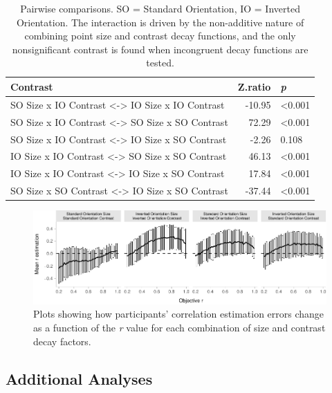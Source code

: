 \documentclass[manuscript, anonymous, screen]{acmart}
\begin{document}
\hypertarget{tbl-contrasts}{}
\begin{table}
\caption{\label{tbl-contrasts}Pairwise comparisons. SO = Standard Orientation, IO = Inverted
Orientation. The interaction is driven by the non-additive nature of
combining point size and contrast decay functions, and the only
nonsignificant contrast is found when incongruent decay functions are
tested. }\tabularnewline

\centering
\begin{tabular}{lrl}
\toprule
Contrast & Z.ratio & \textit{p}\\
\midrule
SO Size x IO Contrast <-> IO Size x IO Contrast & -10.95 & <0.001\\
SO Size x IO Contrast <-> SO Size x SO Contrast & 72.29 & <0.001\\
SO Size x IO Contrast <-> IO Size x SO Contrast & -2.26 & 0.108\\
IO Size x IO Contrast <-> SO Size x SO Contrast & 46.13 & <0.001\\
IO Size x IO Contrast <-> IO Size x SO Contrast & 17.84 & <0.001\\
\addlinespace
SO Size x SO Contrast <-> IO Size x SO Contrast & -37.44 & <0.001\\
\bottomrule
\end{tabular}
\end{table}

\begin{figure}

{\centering \includegraphics[width=1\textwidth,height=\textheight]{size_and_contrast_new_files/figure-pdf/fig-diff-error-bars-plot-1.pdf}

}

\caption{\label{fig-diff-error-bars-plot}Plots showing how participants'
correlation estimation errors change as a function of the \emph{r} value
for each combination of size and contrast decay factors.}

\end{figure}

\hypertarget{sec-add-analyses}{%
\subsection{Additional Analyses}\label{sec-add-analyses}}
\end{document}
